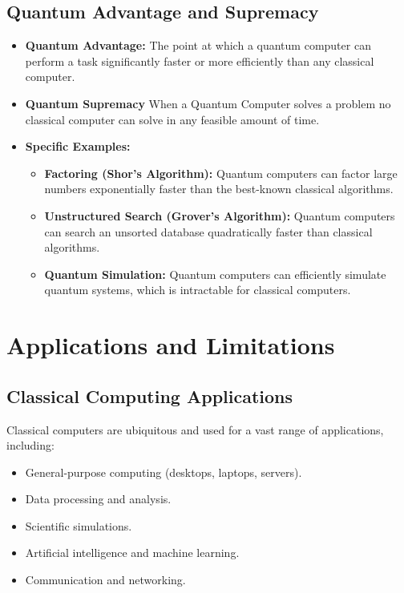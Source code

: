 \documentclass{report}
\begin{document}
\subsection{Quantum Advantage and Supremacy}
\label{subsec:quantum-advantage}
\begin{itemize}
    \item \textbf{Quantum Advantage:} The point at which a quantum computer can perform a task significantly faster or more efficiently than any classical computer.
        \item \textbf{Quantum Supremacy} When a Quantum Computer solves a problem no classical computer can solve in any feasible amount of time.
    \item \textbf{Specific Examples:}
    \begin{itemize}
        \item \textbf{Factoring (Shor's Algorithm):} Quantum computers can factor large numbers exponentially faster than the best-known classical algorithms.
        \item \textbf{Unstructured Search (Grover's Algorithm):}  Quantum computers can search an unsorted database quadratically faster than classical algorithms.
        \item \textbf{Quantum Simulation:} Quantum computers can efficiently simulate quantum systems, which is intractable for classical computers.
    \end{itemize}
\end{itemize}

\section{Applications and Limitations}
\label{sec:applications-limitations}

\subsection{Classical Computing Applications}
\label{subsec:classical-applications}

Classical computers are ubiquitous and used for a vast range of applications, including:

\begin{itemize}
    \item General-purpose computing (desktops, laptops, servers).
    \item Data processing and analysis.
    \item Scientific simulations.
    \item Artificial intelligence and machine learning.
    \item Communication and networking.
\end{itemize}
\end{document}
